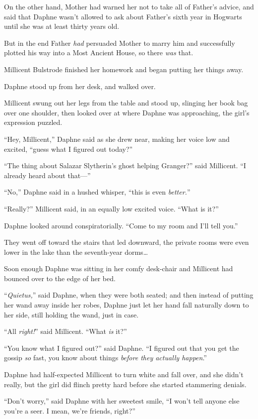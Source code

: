 On the other hand, Mother had warned her not to take all of Father’s advice, and said that Daphne wasn’t allowed to ask about Father’s sixth year in Hogwarts until she was at least thirty years old.

But in the end Father \emph{had} persuaded Mother to marry him and successfully plotted his way into a Most Ancient House, so there \emph{was} that.

Millicent Bulstrode finished her homework and began putting her things away.

Daphne stood up from her desk, and walked over.

Millicent swung out her legs from the table and stood up, slinging her book bag over one shoulder, then looked over at where Daphne was approaching, the girl’s expression puzzled.

“Hey, Millicent,” Daphne said as she drew near, making her voice low and excited, “guess what I figured out today?”

“The thing about Salazar Slytherin’s ghost helping Granger?” said Millicent. “I already heard about that—”

“No,” Daphne said in a hushed whisper, “this is even \emph{better.}”

“Really?” Millicent said, in an equally low excited voice. “What is it?”

Daphne looked around conspiratorially. “Come to my room and I’ll tell you.”

They went off toward the stairs that led downward, the private rooms were even lower in the lake than the seventh-year dorms…

Soon enough Daphne was sitting in her comfy desk-chair and Millicent had bounced over to the edge of her bed.

“\emph{Quietus,}” said Daphne, when they were both seated; and then instead of putting her wand away inside her robes, Daphne just let her hand fall naturally down to her side, still holding the wand, just in case.

“All \emph{right!}” said Millicent. “What \emph{is} it?”

“You know what I figured out?” said Daphne. “I figured out that you get the gossip \emph{so} fast, you know about things \emph{before they actually happen}.”

Daphne had half-expected Millicent to turn white and fall over, and she didn’t really, but the girl did flinch pretty hard before she started stammering denials.

“Don’t worry,” said Daphne with her sweetest smile, “I won’t tell anyone else you’re a seer. I mean, we’re friends, right?”

